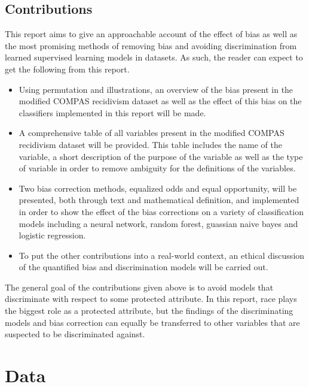 \documentclass[11pt, fleqn, titlepage]{article}
\begin{document}
	\subsection{Contributions}
	This report aims to give an approachable account of the effect of bias as well as the most promising methods of removing bias and avoiding discrimination from learned supervised learning models in datasets. As such, the reader can expect to get the following from this report.
	
	\begin{itemize}
		\item Using permutation and illustrations, an overview of the bias present in the modified COMPAS recidivism dataset as well as the effect of this bias on the classifiers implemented in this report will be made. 
		\item A comprehensive table of all variables present in the modified COMPAS recidivism dataset will be provided. This table includes the name of the variable, a short description of the purpose of the variable as well as the type of variable in order to remove ambiguity for the definitions of the variables.
		\item Two bias correction methods, equalized odds and equal opportunity, will be presented, both through text and mathematical definition, and implemented in order to show the effect of the bias corrections on a variety of classification models including a neural network, random forest, guassian naive bayes and logistic regression.
		\item To put the other contributions into a real-world context, an ethical discussion of the quantified bias and discrimination models will be carried out.
	\end{itemize}
	The general goal of the contributions given above is to avoid models that discriminate with respect to some protected attribute. In this report, race plays the biggest role as a protected attribute, but the findings of the discriminating models and bias correction can equally be transferred to other variables that are suspected to be discriminated against.
	
	\section{Data} \label{data}
	
\end{document}
